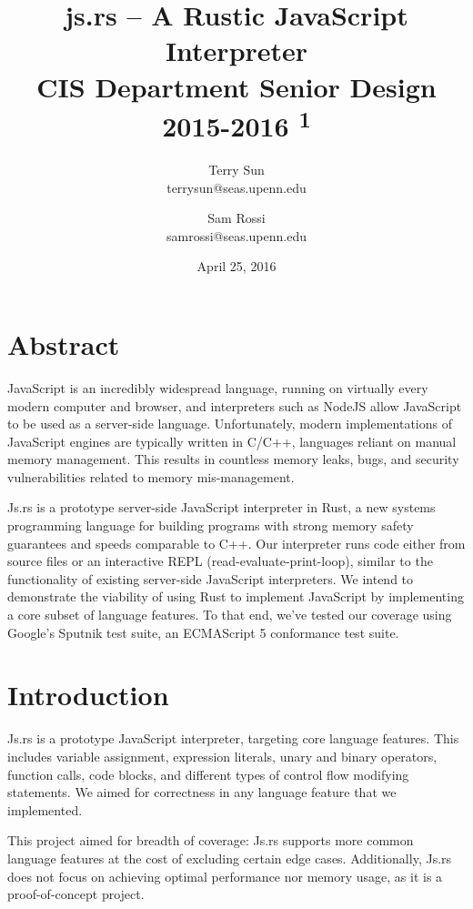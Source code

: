 \documentclass{article}
\title{js.rs -- A Rustic JavaScript Interpreter \\
  {\large CIS Department Senior Design 2015-2016 \textsuperscript{1}}
}
\date{April 25, 2016}
\author{
  Terry Sun\\ terrysun@seas.upenn.edu \and
  Sam Rossi\\ samrossi@seas.upenn.edu
}
\begin{document}
\maketitle

\begin{multicols}{2}

\section*{Abstract}


JavaScript is an incredibly widespread language, running on virtually every
modern computer and browser, and interpreters such as NodeJS allow JavaScript to
be used as a server-side language. Unfortunately, modern implementations of
JavaScript engines are typically written in C/C++, languages reliant on manual
memory management. This results in countless memory leaks, bugs, and security
vulnerabilities related to memory mis-management. \newline

Js.rs is a prototype server-side JavaScript interpreter in Rust, a new systems
programming language for building programs with strong memory safety guarantees
and speeds comparable to C++. Our interpreter runs code either from source files
or an interactive REPL (read-evaluate-print-loop), similar to the functionality
of existing server-side JavaScript interpreters. We intend to demonstrate the
viability of using Rust to implement JavaScript by implementing a core subset of
language features. To that end, we've tested our coverage using Google's Sputnik
test suite, an ECMAScript 5 conformance test suite.

\section{Introduction}

Js.rs is a prototype JavaScript interpreter, targeting core language features.
This includes variable assignment, expression literals, unary and
binary operators, function calls, code blocks, and different types of control
flow modifying statements. We aimed for correctness in any language feature that
we implemented. \newline

This project aimed for breadth of coverage: Js.rs supports more common language
features at the cost of excluding certain edge cases. Additionally, Js.rs does
not focus on achieving optimal performance nor memory usage, as it is a
proof-of-concept project.


\end{multicols}
\end{document}
